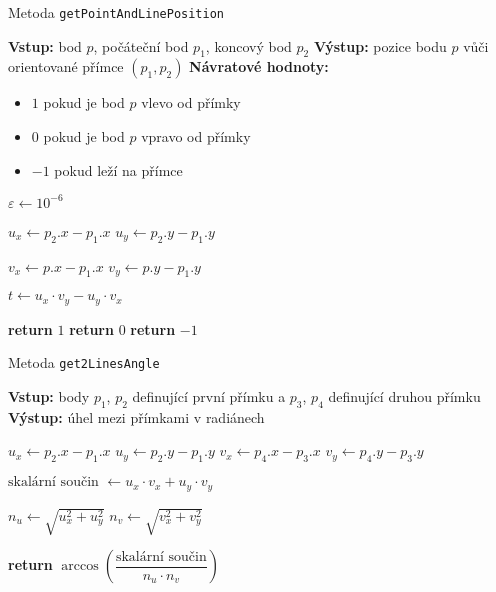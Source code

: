 \begin{algorithm}
    \caption{Metoda \texttt{getPointAndLinePosition}}
    \begin{algorithmic}[1]
        \STATE \textbf{Vstup:} bod $p$, počáteční bod $p_1$, koncový bod $p_2$
        \STATE \textbf{Výstup:} pozice bodu $p$ vůči orientované přímce $(p_1, p_2)$
        \STATE \textbf{Návratové hodnoty:} 
        \begin{itemize}
            \item $1$ pokud je bod $p$ vlevo od přímky
            \item $0$ pokud je bod $p$ vpravo od přímky
            \item $-1$ pokud leží na přímce
        \end{itemize}

        \STATE $\varepsilon \gets 10^{-6}$

        \STATE $u_x \gets p_2.x - p_1.x$
        \STATE $u_y \gets p_2.y - p_1.y$

        \STATE $v_x \gets p.x - p_1.x$
        \STATE $v_y \gets p.y - p_1.y$

        \STATE $t \gets u_x \cdot v_y - u_y \cdot v_x$ 

            \STATE \textbf{return} $1$
            \STATE \textbf{return} $0$
        \ELSE
            \STATE \textbf{return} $-1$
        \ENDIF
    \end{algorithmic}
\end{algorithm}


\begin{algorithm}
    \caption{Metoda \texttt{get2LinesAngle}}
    \begin{algorithmic}[1]
        \STATE \textbf{Vstup:} body $p_1$, $p_2$ definující první přímku a $p_3$, $p_4$ definující druhou přímku
        \STATE \textbf{Výstup:} úhel mezi přímkami v radiánech

        \STATE $u_x \gets p_2.x - p_1.x$
        \STATE $u_y \gets p_2.y - p_1.y$
        \STATE $v_x \gets p_4.x - p_3.x$
        \STATE $v_y \gets p_4.y - p_3.y$

        \STATE $\text{skalární součin } \gets u_x \cdot v_x + u_y \cdot v_y$

        \STATE $n_u \gets \sqrt{u_x^2 + u_y^2}$ 
        \STATE $n_v \gets \sqrt{v_x^2 + v_y^2}$ 

        \STATE \textbf{return} $\arccos\left(\dfrac{\text{skalární součin}}{n_u \cdot n_v}\right)$
    \end{algorithmic}
\end{algorithm}


